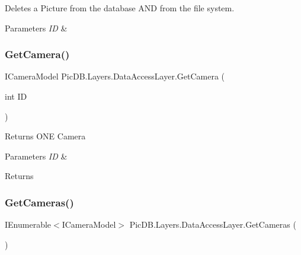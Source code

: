 Deletes a Picture from the database A\+ND from the file system. 


\begin{DoxyParams}{Parameters}
{\em ID} & \\
\hline
\end{DoxyParams}
\mbox{\label{class_pic_d_b_1_1_layers_1_1_data_access_layer_a58aa8e9e53b9c7fdcacb48582daf9f36}} 
\subsubsection{\texorpdfstring{Get\+Camera()}{GetCamera()}}
{\footnotesize\ttfamily I\+Camera\+Model Pic\+D\+B.\+Layers.\+Data\+Access\+Layer.\+Get\+Camera (\begin{DoxyParamCaption}\item[{int}]{ID }\end{DoxyParamCaption})}



Returns O\+NE Camera 


\begin{DoxyParams}{Parameters}
{\em ID} & \\
\hline
\end{DoxyParams}
\begin{DoxyReturn}{Returns}

\end{DoxyReturn}
\mbox{\label{class_pic_d_b_1_1_layers_1_1_data_access_layer_a0aef35ea518e7020dfeb77b9e7f556e9}} 
\subsubsection{\texorpdfstring{Get\+Cameras()}{GetCameras()}}
{\footnotesize\ttfamily I\+Enumerable$<$I\+Camera\+Model$>$ Pic\+D\+B.\+Layers.\+Data\+Access\+Layer.\+Get\+Cameras (\begin{DoxyParamCaption}{ }\end{DoxyParamCaption})}



